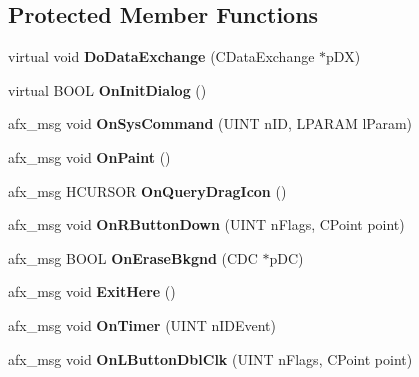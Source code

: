 \subsection*{Protected Member Functions}
\begin{DoxyCompactItemize}
\item 
\hypertarget{class_c_light_box_dlg_a6209ed2b9d3c3700b63c21ef23f07390}{virtual void {\bfseries Do\-Data\-Exchange} (C\-Data\-Exchange $\ast$p\-D\-X)}\label{class_c_light_box_dlg_a6209ed2b9d3c3700b63c21ef23f07390}

\item 
\hypertarget{class_c_light_box_dlg_aa34c31be05285e6e6c540748e173ded4}{virtual B\-O\-O\-L {\bfseries On\-Init\-Dialog} ()}\label{class_c_light_box_dlg_aa34c31be05285e6e6c540748e173ded4}

\item 
\hypertarget{class_c_light_box_dlg_a38128308c2eaa80017bad4ea7b718fac}{afx\-\_\-msg void {\bfseries On\-Sys\-Command} (U\-I\-N\-T n\-I\-D, L\-P\-A\-R\-A\-M l\-Param)}\label{class_c_light_box_dlg_a38128308c2eaa80017bad4ea7b718fac}

\item 
\hypertarget{class_c_light_box_dlg_a8602bc81dc14c6ff604b46870b997b3f}{afx\-\_\-msg void {\bfseries On\-Paint} ()}\label{class_c_light_box_dlg_a8602bc81dc14c6ff604b46870b997b3f}

\item 
\hypertarget{class_c_light_box_dlg_a68ffa57f8c1cb6bc3d035c0ea7d609fd}{afx\-\_\-msg H\-C\-U\-R\-S\-O\-R {\bfseries On\-Query\-Drag\-Icon} ()}\label{class_c_light_box_dlg_a68ffa57f8c1cb6bc3d035c0ea7d609fd}

\item 
\hypertarget{class_c_light_box_dlg_a0613541a3dd08dffff9ee3f3a9791e0c}{afx\-\_\-msg void {\bfseries On\-R\-Button\-Down} (U\-I\-N\-T n\-Flags, C\-Point point)}\label{class_c_light_box_dlg_a0613541a3dd08dffff9ee3f3a9791e0c}

\item 
\hypertarget{class_c_light_box_dlg_ae883d91c058136c354b83a5470c3897f}{afx\-\_\-msg B\-O\-O\-L {\bfseries On\-Erase\-Bkgnd} (C\-D\-C $\ast$p\-D\-C)}\label{class_c_light_box_dlg_ae883d91c058136c354b83a5470c3897f}

\item 
\hypertarget{class_c_light_box_dlg_a58027e134b60dabc2a840c05ec4e8e93}{afx\-\_\-msg void {\bfseries Exit\-Here} ()}\label{class_c_light_box_dlg_a58027e134b60dabc2a840c05ec4e8e93}

\item 
\hypertarget{class_c_light_box_dlg_a60f87a09e6f87343b9dae8c6d3d8ed17}{afx\-\_\-msg void {\bfseries On\-Timer} (U\-I\-N\-T n\-I\-D\-Event)}\label{class_c_light_box_dlg_a60f87a09e6f87343b9dae8c6d3d8ed17}

\item 
\hypertarget{class_c_light_box_dlg_ada0dc7da107efc79e461851497263596}{afx\-\_\-msg void {\bfseries On\-L\-Button\-Dbl\-Clk} (U\-I\-N\-T n\-Flags, C\-Point point)}\label{class_c_light_box_dlg_ada0dc7da107efc79e461851497263596}

\end{DoxyCompactItemize}
